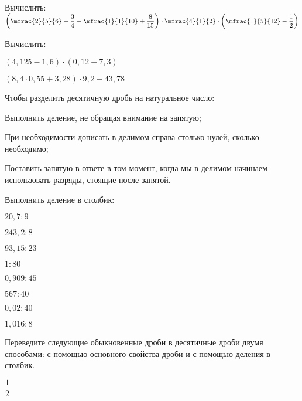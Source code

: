 %
%
\begin{class}[number=5]
	\begin{listofex}
		\item Вычислить:\quad\( \left( \mfrac{2}{5}{6}-\dfrac{3}{4}-\mfrac{1}{1}{10}+\dfrac{8}{15} \right)\cdot\mfrac{4}{1}{2}\cdot\left( \mfrac{1}{5}{12}-\dfrac{1}{2} \right) \)
		\item Вычислить:
		\begin{enumcols}[itemcolumns=2]
			\item \( (4,125-1,6)\cdot(0,12+7,3) \)
			\item \( (8,4\cdot0,55+3,28)\cdot9,2-43,78 \)
		\end{enumcols}
	\end{listofex}
	\begin{definit}
		Чтобы разделить десятичную дробь на натуральное число:
		\begin{enumcols}
			\item Выполнить деление, не обращая внимание на запятую;
			\item При необходимости дописать в делимом справа столько нулей,
			сколько необходимо;
			\item Поставить запятую в ответе в том момент, когда мы в делимом
			начинаем использовать разряды, стоящие после запятой.
		\end{enumcols}
	\end{definit}
	\begin{listofex}[resume]
		\item Выполнить деление в столбик:
		\begin{enumcols}[itemcolumns=4]
			\item \( 20,7:9 \)
			\item \( 243,2:8 \)
			\item \( 93,15:23 \)
			\item \( 1:80 \)
			\item \( 0,909:45 \)
			\item \( 567:40 \)
			\item \( 0,02:40 \)
			\item \( 1,016:8 \)
		\end{enumcols}
		\item Переведите следующие обыкновенные дроби в десятичные дроби двумя способами: с
		помощью основного свойства дроби и с помощью деления в столбик.
		\begin{enumcols}[itemcolumns=6]
			\item \( \dfrac{1}{2} \)

\end{enumcols}
\end{listofex}
\end{class}
